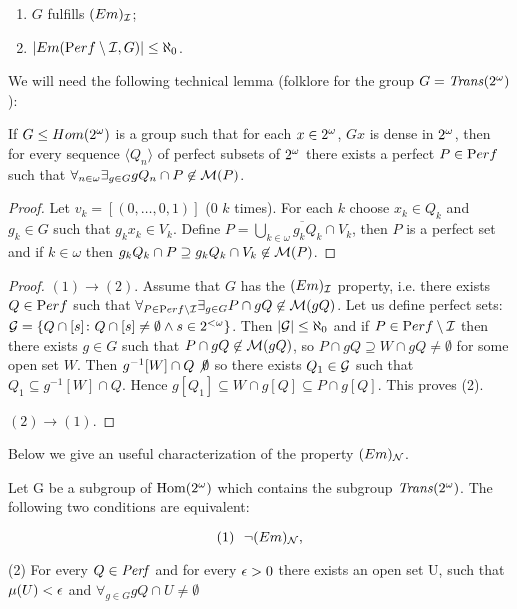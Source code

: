 \begin{enumerate}
\item
  $G$ fulfills $(Em)_{{\cal I}}$; 
\item
  $|Em({\mathrm Perf}\setminus {\cal I}, G) | \leq \aleph_0$.
\end{enumerate}

  We will need the following technical lemma
(folklore for the group $G = {\it Trans}(2^{\omega})$):
\begin{lemma}\label{lemma-dense}
If $G\leq Hom(2^{\omega})$ is a group such that for each 
$x\in2^{\omega}$, $Gx$ is dense in $2^{\omega}$,
then for every sequence $\langle Q_n\rangle$
of perfect subsets of $2^{\omega}$ there exists
a perfect $P\in{\mathrm Perf}$ such that 
$\forall_{n\in\omega} \exists_{g\in G} gQ_n \cap P 
\not \in \mathcal{M}(P)$.
\end{lemma}
\begin{proof}
Let $v_k = [(0,\ldots,0, 1)]$ ($0$ $k$ times).
For each $k$ choose $x_k\in Q_k$ and $g_k\in G$
such that $g_k x_k \in V_k$. Define
$P = \overline{\bigcup_{k\in\omega}g_k Q_k \cap V_k}$,
then $P$ is a perfect set and if $k\in\omega$
then 
$g_k Q_k \cap P \supseteq g_k Q_k \cap V_k \not\in \mathcal{M}(P)$.
\end{proof}

\begin{proof}%
$(1)\to (2)$.
Assume that $G$ has the $(Em)_{\cal I}$ property,
i.e. there exists $Q\in{\mathrm Perf}$ such that
$\forall_{P\in{\mathrm Perf}\setminus{\cal I}}\exists_{g\in G} 
P\cap gQ\not\in \mathcal{M}(gQ)$. 
Let us define perfect sets:
${\cal G} = \{Q \cap [s] \colon Q \cap [s] \not= \emptyset \wedge
s\in 2^{<\omega}\}$.
Then $|{\cal G}| \leq \aleph_0$ and if $P\in{\mathrm Perf}\setminus{\cal I}$
then there exists $g\in G$ such that
$P\cap gQ \not\in\mathcal{M}(gQ)$, so
$P\cap gQ \supseteq W\cap gQ \not= \emptyset$
for some open set $W$.
Then $g^{-1}[W] \cap Q \not\emptyset$
so there exists $Q_1\in {\cal G}$ such that
$Q_1 \subseteq g^{-1}[W] \cap Q$.
Hence $g[Q_1] \subseteq W \cap g[Q] \subseteq P \cap g[Q]$.
This proves (2).

$(2)\to(1)$.

\end{proof}

 
  Below we give an useful characterization of the
property $(Em)_{{\cal N}}$.

\medskip

\begin{theorem}
Let G be a subgroup of ${\rm Hom(2^{\omega})}$ which contains the
subgroup ${\it Trans}(2^{\omega})$. The following two conditions are
equivalent:

\[ (1)\ \ \neg (Em)_{{\cal N}}, \]

\par (2) For every $Q \in {\it Perf}$
and for every $\epsilon > 0$ there exists an open
set U, such that
$\mu(U) < \epsilon$
and $\forall_{g \in G} gQ \cap U \not = \emptyset$
\end{theorem}

